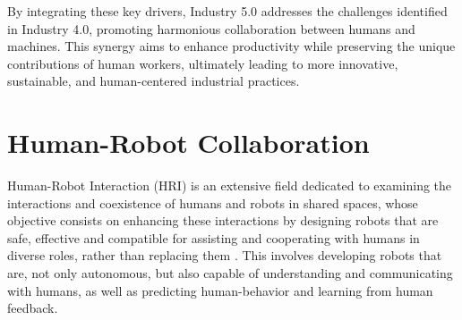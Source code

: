 By integrating these key drivers, Industry 5.0 addresses the challenges identified in Industry 4.0, promoting harmonious collaboration between humans and machines. This synergy aims to enhance productivity while preserving the unique contributions of human workers, ultimately leading to more innovative, sustainable, and human-centered industrial practices.





\section{Human-Robot Collaboration}
\label{subsection:human-robot-collab}
% 

Human-Robot Interaction (\ac{HRI}) is an extensive field dedicated to examining the interactions and coexistence of humans and robots in shared spaces, whose objective consists on enhancing these interactions by designing robots that are safe, effective and compatible for assisting and cooperating with humans in diverse roles, rather than replacing them \cite{Ogenyi2021}.
This involves developing robots that are, not only autonomous, but also capable of understanding and communicating with humans, as well as predicting
human-behavior and learning from human feedback. 

